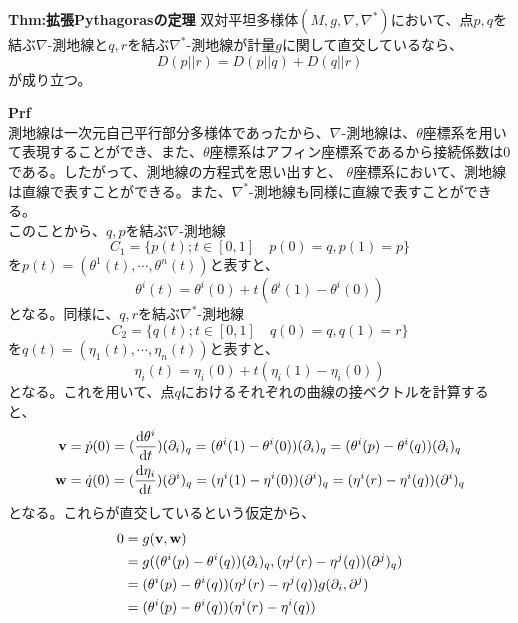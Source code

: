 \documentclass[a4paper,11pt]{jsarticle}
\numberwithin{equation}{section}
\begin{document}
\begin{itembox}[l]{\textbf{Thm:拡張Pythagorasの定理}}
    双対平坦多様体$(M,g,\nabla,\nabla^*)$において、点$p,q$を結ぶ$\nabla$-測地線と$q,r$を結ぶ$\nabla^*$-測地線が計量$g$に関して直交しているなら、
    \begin{equation}
        D(p||r) = D(p||q) + D(q||r)
    \end{equation}
    が成り立つ。
\end{itembox}
\textbf{Prf}\\
測地線は一次元自己平行部分多様体であったから、$\nabla$-測地線は、$\theta$座標系を用いて表現することができ、また、$\theta$座標系はアフィン座標系であるから接続係数は0である。したがって、測地線の方程式を思い出すと、
$\theta$座標系において、測地線は直線で表すことができる。また、$\nabla^*$-測地線も同様に直線で表すことができる。\\
このことから、$q,p$を結ぶ$\nabla$-測地線
\begin{equation}
    C_1 =\{p(t) ; t \in [0,1] \quad p(0) = q, p(1) = p\}
\end{equation}
を$p(t)=(\theta^1(t),\cdots,\theta^n(t))$と表すと、
\begin{equation}
    \theta^i(t) = \theta^i(0) + t(\theta^i(1) - \theta^i(0))
\end{equation}
となる。同様に、$q,r$を結ぶ$\nabla^*$-測地線
\begin{equation}
    C_2 =\{q(t) ; t \in [0,1] \quad q(0) = q, q(1) = r\}
\end{equation}
を$q(t)=(\eta_1(t),\cdots,\eta_n(t))$と表すと、
\begin{equation}
    \eta_i(t) = \eta_i(0) + t(\eta_i(1) - \eta_i(0))
\end{equation}
となる。これを用いて、点$q$におけるそれぞれの曲線の接ベクトルを計算すると、
\begin{align}
    \vb{v} &= \dot{p}(0) = (\dv{\theta^i}{t}(0))(\partial_i)_q = (\theta^i(1) - \theta^i(0))(\partial_i)_q =(\theta^i(p) - \theta^i(q))(\partial_i)_q\\
    \vb{w} &= \dot{q}(0) = (\dv{\eta_i}{t}(0))(\partial^i)_q = (\eta^i(1) - \eta^i(0))(\partial^i)_q =(\eta^i(r) - \eta^i(q))(\partial^i)_q
\end{align}
となる。これらが直交しているという仮定から、
\begin{align}
    0 &= g(\vb{v},\vb{w}) \\
    &= g((\theta^i(p) - \theta^i(q))(\partial_i)_q,(\eta^j(r) - \eta^j(q))(\partial^j)_q) \\
    &= (\theta^i(p) - \theta^i(q))(\eta^j(r) - \eta^j(q))g(\partial_i,\partial^j) \\
    &= (\theta^i(p) - \theta^i(q))(\eta^i(r) - \eta^i(q))
\end{align}
\end{document}
